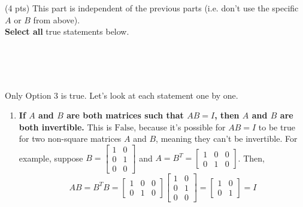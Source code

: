 \documentclass[11pt]{article}
\begin{document}
\begin{prob}
\vspace{0.2in}

\begin{subprob}(4 pts) This part is independent of the previous parts (i.e. don't use the specific $A$ or $B$ from above). \\
    
\textbf{Select all} true statements below. 

 \\
 \\
 \\

\begin{solution}
Only Option 3 is true. Let's look at each statement one by one.

\begin{enumerate}
    \item \textbf{If $A$ and $B$ are both matrices such that $AB = I$, then $A$ and $B$ are both invertible.} This is $\boxed{\text{False}}$, because it's possible for $AB = I$ to be true for two non-square matrices $A$ and $B$, meaning they can't be invertible. For example, suppose $B = \begin{bmatrix} 1 & 0 \\ 0 & 1 \\ 0 & 0\end{bmatrix}$ and $A = B^T = \begin{bmatrix} 1 & 0 & 0 \\ 0 & 1 & 0 \end{bmatrix}$. Then,
    $$AB = B^TB = \begin{bmatrix} 1 & 0 & 0 \\ 0 & 1 & 0 \end{bmatrix} \begin{bmatrix} 1 & 0 \\ 0 & 1 \\ 0 & 0 \end{bmatrix} = \begin{bmatrix} 1 & 0 \\ 0 & 1  \end{bmatrix} = I$$


\end{enumerate}
\end{solution}
\end{subprob}
\end{prob}
\end{document}
